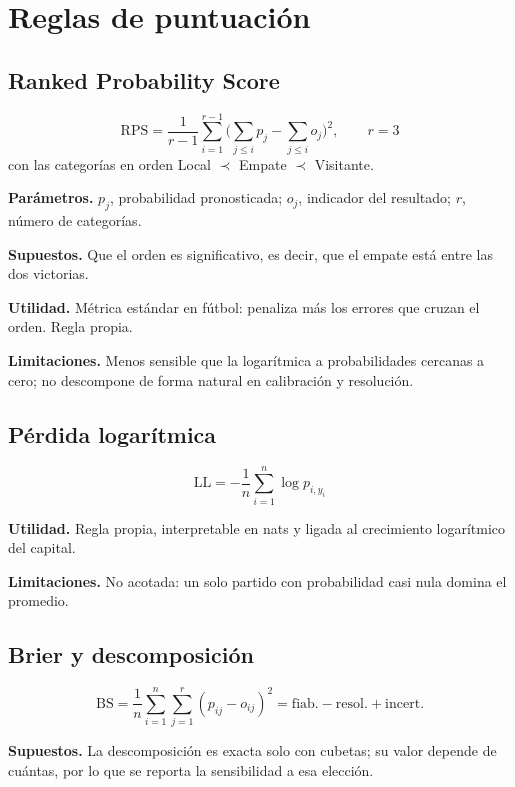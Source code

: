 \documentclass{pas}
\begin{document}
\section{Reglas de puntuación}

\subsection{Ranked Probability Score}
\begin{equation}
\mathrm{RPS} = \frac{1}{r-1}\sum_{i=1}^{r-1}\Bigg(\sum_{j\le i} p_j - \sum_{j\le i} o_j\Bigg)^{2},
\qquad r = 3
\end{equation}
con las categorías en orden Local $\prec$ Empate $\prec$ Visitante.

\textbf{Parámetros.} $p_j$, probabilidad pronosticada; $o_j$, indicador del resultado; $r$, número de categorías.

\textbf{Supuestos.} Que el orden es significativo, es decir, que el empate está entre las dos victorias.

\textbf{Utilidad.} Métrica estándar en fútbol: penaliza más los errores que cruzan el orden. Regla propia.

\textbf{Limitaciones.} Menos sensible que la logarítmica a probabilidades cercanas a cero; no descompone de forma
natural en calibración y resolución.

\subsection{Pérdida logarítmica}
\begin{equation}
\mathrm{LL} = -\frac{1}{n}\sum_{i=1}^{n}\log p_{i,y_i}
\end{equation}

\textbf{Utilidad.} Regla propia, interpretable en nats y ligada al crecimiento logarítmico del capital.

\textbf{Limitaciones.} No acotada: un solo partido con probabilidad casi nula domina el promedio.

\subsection{Brier y descomposición}
\begin{equation}
\mathrm{BS} = \frac{1}{n}\sum_{i=1}^{n}\sum_{j=1}^{r}(p_{ij}-o_{ij})^{2}
= \mathrm{fiab.} - \mathrm{resol.} + \mathrm{incert.}
\end{equation}

\textbf{Supuestos.} La descomposición es exacta solo con cubetas; su valor depende de cuántas, por lo que se
reporta la sensibilidad a esa elección.
\end{document}
